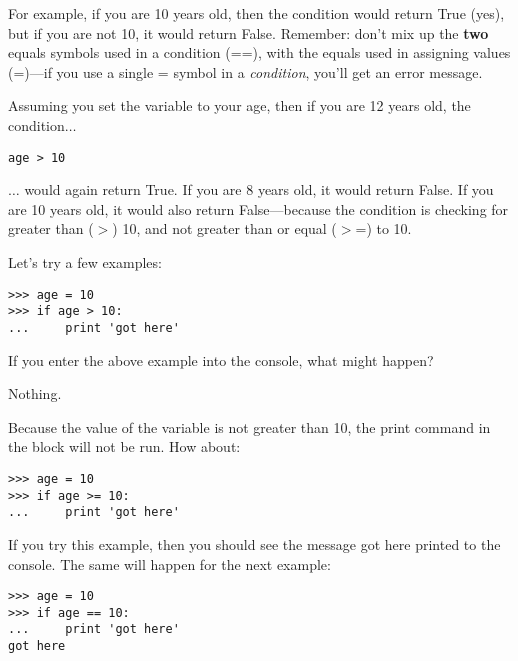 For example, if you are 10 years old, then the condition  would return True (yes), but if you are not 10, it would return False.  Remember: don't mix up the \textbf{two} equals symbols used in a condition (==), with the equals used in assigning values (=)---if you use a single = symbol in a \emph{condition}, you'll get an error message.
\par
Assuming you set the variable  to your age, then if you are 12 years old, the condition$\ldots$

\begin{listing}
\begin{verbatim}
age > 10
\end{verbatim}
\end{listing}

$\ldots$ would again return True.  If you are 8 years old, it would return False.  If you are 10 years old, it would also return False---because the condition is checking for greater than ($>$) 10, and not greater than or equal ($>$=) to 10.

Let's try a few examples:

\begin{listing}
\begin{verbatim}
>>> age = 10
>>> if age > 10:
...     print 'got here'
\end{verbatim}
\end{listing}

\noindent
If you enter the above example into the console, what might happen?
\par
\noindent
Nothing.
\par
\noindent
Because the value of the variable  is not greater than 10, the print command in the block will not be run. How about:

\begin{listingignore}
\begin{verbatim}
>>> age = 10
>>> if age >= 10:
...     print 'got here'
\end{verbatim}
\end{listingignore}

If you try this example, then you should see the message got here printed to the console.  The same will happen for the next example:

\begin{listing}
\begin{verbatim}
>>> age = 10
>>> if age == 10:
...     print 'got here'
got here
\end{verbatim}
\end{listing}

